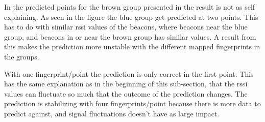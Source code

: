 
In the predicted points for the brown group presented in  the result is not as self explaining.
As seen in the figure the blue group get predicted at two points.
This has to do with similar \acrshort{rssi} values of the beacons, where beacons near the blue group, and beacons in or near the brown group has similar values.
A result from this makes the prediction more unstable with the different mapped fingerprints in the groups.

\bigskip

With one fingerprint/point the prediction is only correct in the first point.
This has the same explanation as in the beginning of this sub-section, that the \acrshort{rssi} values can fluctuate so much that the outcome of the prediction changes.
The prediction is stabilizing with four fingerprints/point because there is more data to predict against, and signal fluctuations doesn't have as large impact.
